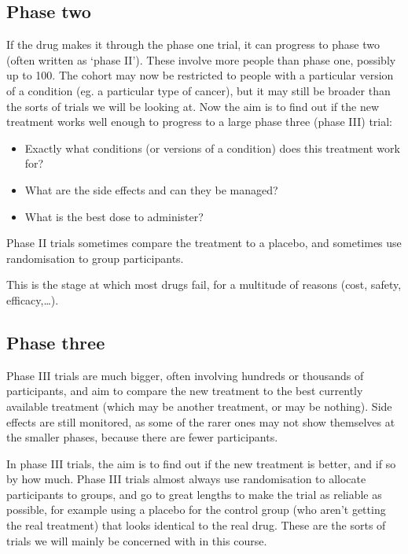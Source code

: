 \documentclass[
  openany]{book}
\providecommand{\tightlist}{%
  \setlength{\itemsep}{0pt}\setlength{\parskip}{0pt}}
\theoremstyle{definition}
\theoremstyle{definition}
\theoremstyle{definition}
\theoremstyle{definition}
\theoremstyle{remark}
\begin{document}
\subsection*{Phase two}\label{phase-two}

If the drug makes it through the phase one trial, it can progress to phase two (often written as `phase II'). These involve more people than phase one, possibly up to 100. The cohort may now be restricted to people with a particular version of a condition (eg. a particular type of cancer), but it may still be broader than the sorts of trials we will be looking at. Now the aim is to find out if the new treatment works well enough to progress to a large phase three (phase III) trial:

\begin{itemize}
\tightlist
\item
  Exactly what conditions (or versions of a condition) does this treatment work for?
\item
  What are the side effects and can they be managed?
\item
  What is the best dose to administer?
\end{itemize}

Phase II trials sometimes compare the treatment to a placebo, and sometimes use randomisation to group participants.

This is the stage at which most drugs fail, for a multitude of reasons (cost, safety, efficacy,\ldots).

\subsection*{Phase three}\label{phase-three}

Phase III trials are much bigger, often involving hundreds or thousands of participants, and aim to compare the new treatment to the best currently available treatment (which may be another treatment, or may be nothing). Side effects are still monitored, as some of the rarer ones may not show themselves at the smaller phases, because there are fewer participants.

In phase III trials, the aim is to find out if the new treatment is better, and if so by how much. Phase III trials almost always use randomisation to allocate participants to groups, and go to great lengths to make the trial as reliable as possible, for example using a placebo for the control group (who aren't getting the real treatment) that looks identical to the real drug. These are the sorts of trials we will mainly be concerned with in this course.
\end{document}
